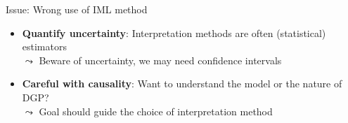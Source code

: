 \documentclass[11pt,compress,t,notes=noshow, aspectratio=169, xcolor=table]{beamer}
\begin{document}
\begin{frame}{Issue: Wrong use of IML method~}
    \begin{itemize}
        \item \textbf{Quantify uncertainty}: Interpretation methods are often (statistical) estimators \\
        $\leadsto$ Beware of uncertainty, we may need confidence intervals\\
        \item<3> \textbf{Careful with causality}:
        Want to understand the model or the nature of DGP?\\
        $\leadsto$ Goal should guide the choice of interpretation method
    \end{itemize}
\end{frame}


\endlecture
\end{document}
